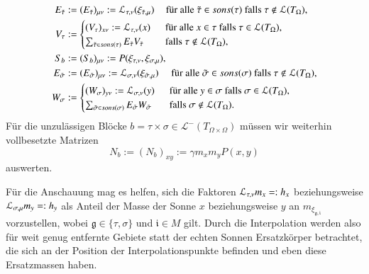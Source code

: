     \begin{align}
      E_{\tilde \tau} &:=
	(E_{\tilde \tau})_{\mu \nu} := \mathcal{L}_{\tau, \nu}(\xi_{\tilde \tau, \mu}) \ \ \ \, \text{ für alle } \tilde \tau \in sons(\tau) \text{ falls } \tau \notin \mathcal{L}(T_\Omega), \nonumber\\
      V_\tau &:=
      \begin{cases}
	(V_\tau)_{x \nu}   := \mathcal{L}_{\tau, \nu}(x) & \ \text{ für alle } x \in \tau \text{ falls } \tau \in \mathcal{L}(T_\Omega),\\
	\sum_{\tilde \tau \in sons(\tau)} E_{\tilde \tau} V_{\tilde \tau}  & \ \text{ falls } \tau \notin \mathcal{L}(T_\Omega),\\
      \end{cases}\label{eq:vtau}\\
      S_b &:= (S_b)_{\mu \nu} := P( \xi_{\tau, \nu} , \xi_{\sigma, \mu} ), \nonumber\\
      E_{\tilde \sigma} &:=
	(E_{\tilde \sigma})_{\mu \nu} := \mathcal{L}_{\sigma, \nu}(\xi_{\tilde \sigma, \mu}) \ \ \ \; \text{ für alle } \tilde \sigma \in sons(\sigma) \text{ falls } \tau \notin \mathcal{L}(T_\Omega), \nonumber\\
      W_\sigma &:=
      \begin{cases}
	(W_\sigma)_{y \nu}   := \mathcal{L}_{\sigma, \nu}(y) & \ \text{ für alle } y \in \sigma \text{ falls } \sigma \in \mathcal{L}(T_\Omega),\\
	\sum_{\tilde \sigma \in sons(\sigma)} E_{\tilde \sigma} W_{\tilde \sigma}  & \ \text{ falls } \sigma \notin \mathcal{L}(T_\Omega).\\
      \end{cases}\label{eq:wsigma}      
    \end{align}
    Für die unzulässigen Blöcke $b = \tau \times \sigma \in \mathcal{L}^-(T_{\Omega \times \Omega})$ müssen wir weiterhin vollbesetzte Matrizen
    \[
      N_b := (N_b)_{xy} := \gamma m_x  m_y P(x, y)
    \]
    auswerten.

    Für die Anschauung mag es helfen, sich die Faktoren $\mathcal{L}_{\tau, \nu} m_x =: h_x$ beziehungsweise $\mathcal{L}_{\sigma, \mu} m_y =: h_y$ als Anteil der Masse der Sonne $x$ beziehungsweise $y$ an 
     $m_{\xi_{\mathfrak{g}, \mathfrak{i}}}$ vorzustellen, wobei $\mathfrak{g} \in \{\tau, \sigma\}$ und $\mathfrak{i} \in M$ gilt.
    Durch die Interpolation werden also für weit genug entfernte Gebiete statt der echten Sonnen Ersatzkörper betrachtet, die sich an der Position der Interpolationspunkte befinden 
    und eben diese Ersatzmassen haben. 
    
